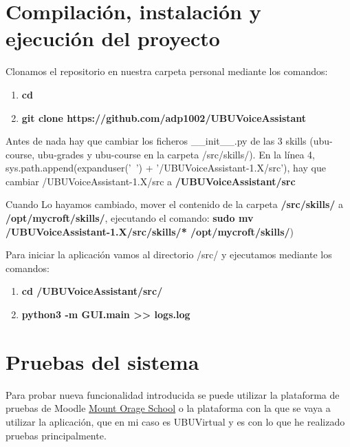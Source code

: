 \section{Compilación, instalación y ejecución del proyecto}

Clonamos el repositorio en nuestra carpeta personal mediante los comandos:
\begin{enumerate}
	\item \textbf{cd \detokenize{~}}
	\item \textbf{git clone https://github.com/adp1002/UBUVoiceAssistant}
\end{enumerate}

Antes de nada hay que cambiar los ficheros \_\_init\_\_.py de las 3 skills (ubu-course, ubu-grades y ubu-course en la carpeta /src/skills/). En la línea 4, sys.path.append(expanduser('~') + '/UBUVoiceAssistant-1.X/src'), hay que cambiar /UBUVoiceAssistant-1.X/src a \textbf{/UBUVoiceAssistant/src}

Cuando Lo hayamos cambiado, mover el contenido de la carpeta \textbf{\detokenize{~}/src/skills/} a \textbf{/opt/mycroft/skills/}, ejecutando el comando:
\textbf{sudo mv \detokenize{~}/UBUVoiceAssistant-1.X/src/skills/* /opt/mycroft/skills/})

Para iniciar la aplicación vamos al directorio /src/ y ejecutamos mediante los comandos:
\begin{enumerate}
	\item \textbf{cd \detokenize{~}/UBUVoiceAssistant/src/}
	\item \textbf{python3 -m GUI.main >\null> logs.log}
\end{enumerate}

\section{Pruebas del sistema}

Para probar nueva funcionalidad introducida se puede utilizar la plataforma de pruebas de Moodle \href{https://school.moodledemo.net/}{Mount Orage School} o la plataforma con la que se vaya a utilizar la aplicación, que en mi caso es UBUVirtual y es con lo que he realizado pruebas principalmente.